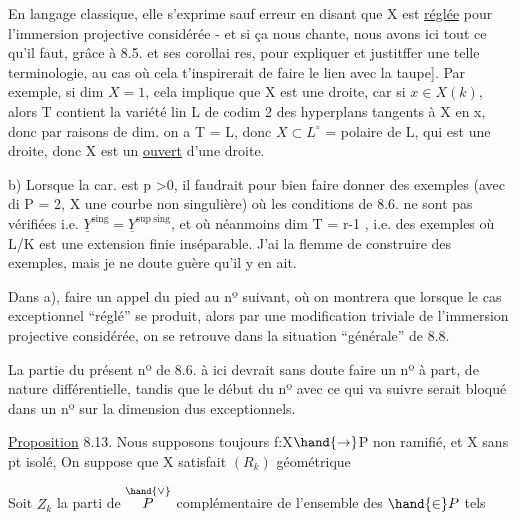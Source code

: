 

En langage classique, elle s'exprime  sauf erreur en disant
que X est \uline{réglée} pour l'immersion projective considérée \hand{[}- et si ça nous
chante, nous avons ici  tout ce qu'il faut, grâce à 8.5. et ses corollai
res, pour expliquer et justitffer une telle terminologie, au cas où cela
t'inspirerait de faire le lien avec la taupe]. Par exemple, si dim $X=1$, cela implique que X est une droite, car si $x \in X(k)$, alors T contient la variété lin L de codim 2 des hyperplans tangents à X en x, donc par raisons de dim. on a \unsure{-|:} T = L, donc $X \subset L^{\circ}$ = polaire de L, qui est une droite, donc X est un \uline{ouvert} d'une droite.

b)  Lorsque la car. est p >0, il faudrait pour bien faire donner
des exemples (avec di P = 2, X une courbe non singulière) où  les
conditions de 8.6. ne sont pas vérifiées i.e. $\underline{Y}^{\mathrm{sing}} = \underline{Y}^{\mathrm{sup\ sing}}$, et où
néanmoins  dim T = r-1 , i.e. des exemples où  L/K est une extension finie
inséparable.  J'ai la flemme de construire des exemples, mais je ne
doute guère qu'il y en ait.

 Dans a), faire un appel du pied au  nº suivant,
où on montrera que lorsque le cas exceptionnel ``réglé'' se produit, alors 
par une modification triviale de l'immersion projective considérée, on
se retrouve dans la situation  ``générale''  de 8.8.

La partie du présent nº de 8.6. à ici  devrait sans doute faire
un nº à part, de nature différentielle,  tandis que le début du nº avec
ce qui va suivre serait bloqué dans un nº  sur  la dimension dus
exceptionnels. 

\uline{Proposition} 8.13.   Nous supposons toujours f:X$\hand{\to}$P non ramifié, et X sans pt isolé, 
On suppose que X satisfait $(R_k)$ géométrique







  Soit $Z_k$ la parti
de $\overset{\hand{\vee}}{P}$  complémentaire de l'ensemble des \hand{$\xi$}$\hand{\in} P$  tels

